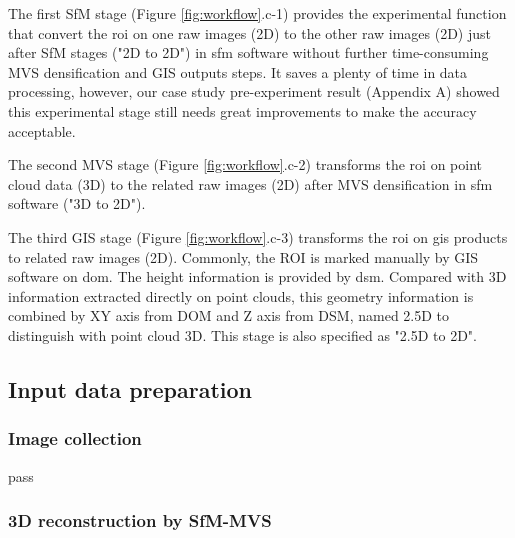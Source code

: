 \documentclass{configs/bmcart}
\begin{document}
The first SfM stage (Figure \ref{fig:workflow}.c-1) provides the experimental function that convert the \acrfull*{roi} on one raw images (2D) to the other raw images (2D) just after SfM stages ("2D to 2D") in \acrlong*{sfm} software without further time-consuming MVS densification and GIS outputs steps. It saves a plenty of time in data processing, however, our case study pre-experiment result (Appendix A) showed this experimental stage still needs great improvements to make the accuracy acceptable.

The second MVS stage (Figure \ref{fig:workflow}.c-2) transforms the \acrfull*{roi} on point cloud data (3D) to the related raw images (2D) after MVS densification in \acrlong*{sfm} software ("3D to 2D"). 

The third GIS stage (Figure \ref{fig:workflow}.c-3) transforms the \acrfull*{roi} on \acrfull*{gis} products to related raw images (2D). Commonly, the ROI is marked manually by GIS software on \acrfull*{dom}. The height information is provided by \acrfull*{dsm}. Compared with 3D information extracted directly on point clouds, this geometry information is combined by XY axis from DOM and Z axis from DSM, named 2.5D to distinguish with point cloud 3D. This stage is also specified as "2.5D to 2D".

\subsection*{Input data preparation}

\subsubsection*{Image collection}
pass

\subsubsection*{3D reconstruction by SfM-MVS}


\end{document}
